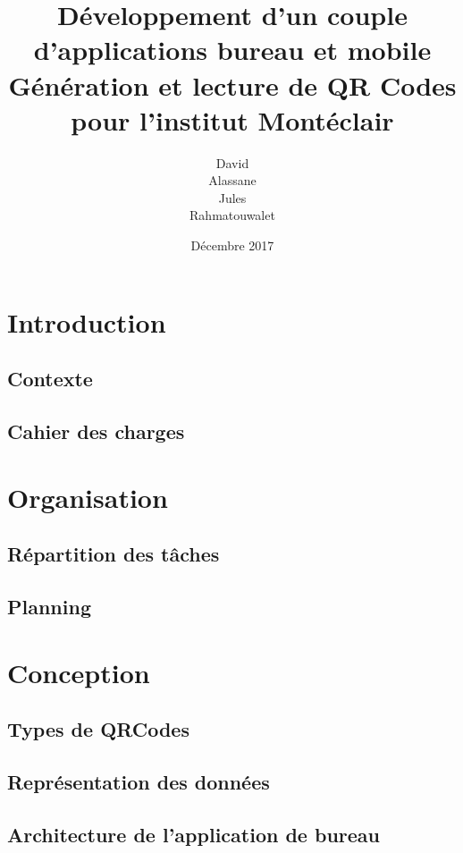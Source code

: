 \documentclass{report}
\title{%
		Développement d'un couple d'applications bureau et mobile\\ \large
		Génération et lecture de QR Codes pour l'institut Montéclair}
\author{David \bsc{Dembele}\\ Alassane \bsc{Diop}\\
		Jules \bsc{Leguy}\\ Rahmatouwalet \bsc{Mohamedoun}}
\date{Décembre 2017}
\begin{document}
\maketitle

\tableofcontents

\chapter{Introduction}

	\section{Contexte}
		
	
	\section{Cahier des charges}
		


\chapter{Organisation}

	\section{Répartition des tâches}
		
	
	\section{Planning}
		
		
		
\chapter{Conception}

	\section{Types de QRCodes}
		
		
	\section{Représentation des données}
		
		
	\section{Architecture de l'application de bureau}
		
\end{document}
